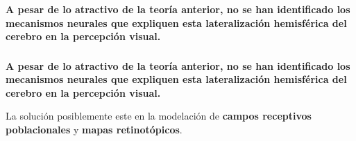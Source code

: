 \documentclass[
11pt, %
%
aspectratio=169, %
]{beamer}
\begin{document}
	\begin{frame}
		\frametitle{}
		\textbf{A pesar de lo atractivo de la teor\'ia anterior, no se han identificado los mecanismos neurales que expliquen esta lateralizaci\'on hemisf\'erica del cerebro en la percepci\'on visual.}
		\newline
		
		

		
	\end{frame}

\begin{frame}
	\frametitle{}
	\textbf{A pesar de lo atractivo de la teor\'ia anterior, no se han identificado los mecanismos neurales que expliquen esta lateralizaci\'on hemisf\'erica del cerebro en la percepci\'on visual.}
	\newline
	
	La soluci\'on posiblemente este en la modelaci\'on de \textbf{campos receptivos poblacionales} y \textbf{mapas retinot\'opicos}.
	
	
	
\end{frame}
\end{document}
